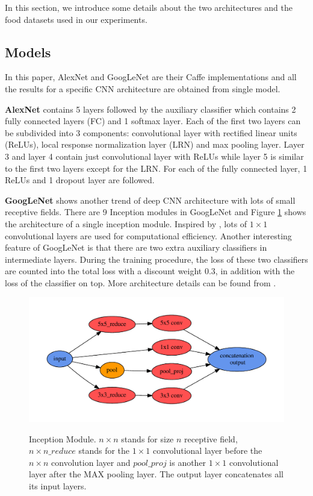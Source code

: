 In this section, we introduce some details about the two architectures and the food datasets used in our experiments.
\subsection{Models}
In this paper, AlexNet and GoogLeNet are their Caffe \cite{jia2014caffe} implementations and all the results for a specific CNN architecture are obtained from single model.

\textbf{AlexNet}
 contains 5 layers followed by the auxiliary classifier which contains 2 fully connected layers (FC) and 1 softmax layer. Each of the first two layers can be subdivided into 3 components: convolutional layer with rectified linear units (ReLUs), local response normalization layer (LRN) and max pooling layer. Layer 3 and layer 4 contain just convolutional layer with ReLUs while layer 5 is similar to the first two layers except for the LRN. For each of the fully connected layer, 1 ReLUs and 1 dropout \cite{srivastava2014dropout} layer are followed.

 \textbf{GoogLeNet}
  shows another trend of deep CNN architecture with lots of small receptive fields. There are 9 Inception modules in GoogLeNet and Figure \ref{incept} shows the architecture of a single inception module. Inspired by \cite{linNiN}, lots of $1\times 1$ convolutional layers are used for computational efficiency. Another interesting feature of GoogLeNet is that there are two extra auxiliary classifiers in intermediate layers. During the training procedure, the loss of these two classifiers are counted into the total loss with a discount weight 0.3, in addition with the loss of the classifier on top. More architecture details can be found from \cite{szegedy2014going}.
\begin{figure}
  \centering
  \includegraphics[scale=.7]{cnn/fig/inception.pdf}\\
  \caption{Inception Module. $n\times n$ stands for size $n$ receptive field, $n\times n\_reduce$ stands for the $1\times 1$ convolutional layer before the $n\times n$ convolution layer and $pool\_proj$ is another $1\times 1$ convolutional layer after the MAX pooling layer. The output layer concatenates all its input layers.}\label{incept}
\end{figure}

